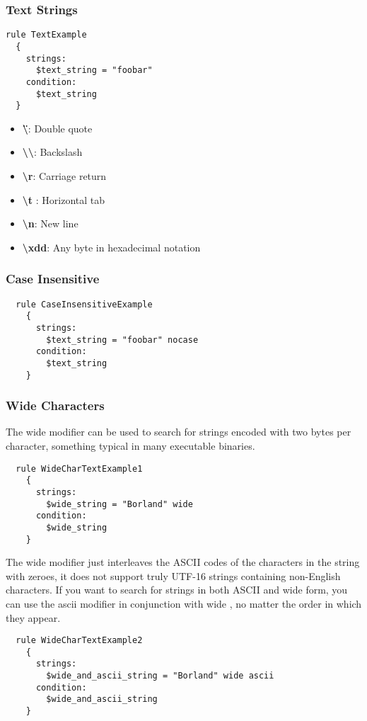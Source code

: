 \subsubsection{Text Strings}
\begin{lstlisting}
rule TextExample
  {
    strings:
      $text_string = "foobar"
    condition:
      $text_string
  }
\end{lstlisting}
\begin{itemize}
  \item \textbf{\textbackslash \"}: Double quote
  \item \textbf{\textbackslash \textbackslash}: Backslash
  \item \textbf{\textbackslash r}: Carriage return
  \item \textbf{\textbackslash t }: Horizontal tab
  \item \textbf{\textbackslash n}: New line
  \item \textbf{\textbackslash xdd}: Any byte in hexadecimal notation
\end{itemize}

\subsubsection{Case Insensitive}
\begin{lstlisting}
  rule CaseInsensitiveExample
    {
      strings:
        $text_string = "foobar" nocase
      condition:
        $text_string
    }
\end{lstlisting}

\subsubsection{Wide Characters}
The wide modifier can be used to search for strings encoded with two bytes per character, something typical in many executable binaries.
\begin{lstlisting}
  rule WideCharTextExample1
    {
      strings:
        $wide_string = "Borland" wide
      condition:
        $wide_string
    }
\end{lstlisting}
The wide modifier just interleaves the ASCII codes of the characters in the string with zeroes, it does not support truly UTF-16 strings containing non-English characters. 
If you want to search for strings in both ASCII and wide form, you can use the ascii modifier in conjunction with wide , no matter the order in which they appear.
\begin{lstlisting}
  rule WideCharTextExample2
    {
      strings:
        $wide_and_ascii_string = "Borland" wide ascii
      condition:
        $wide_and_ascii_string
    }
\end{lstlisting}

